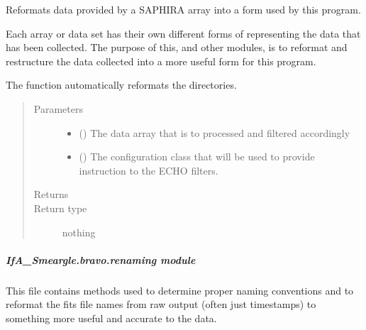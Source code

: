 \documentclass[letterpaper,10pt,english]{sphinxmanual}
\begin{document}
\begin{fulllineitems}
\label{\detokenize{python_docstrings/IfA_Smeargle.bravo.bravo_main:IfA_Smeargle.bravo.bravo_main.bravo_execution_saphira}}
Reformats data provided by a SAPHIRA array into a form used by this
program.

Each array or data set has their own different forms of representing the
data that has been collected. The purpose of this, and other modules, is
to reformat and restructure the data collected into a more useful form
for this program.

The function automatically reformats the directories.
\begin{quote}\begin{description}
\item[{Parameters}] \leavevmode\begin{itemize}
\item {} 
 () \textendash{} The data array that is to processed and filtered accordingly

\item {} 
 ({\hyperref[\detokenize{python_docstrings/IfA_Smeargle.yankee.yankee_main:IfA_Smeargle.yankee.yankee_main.SmeargleConfig}]{}}) \textendash{} The configuration class that will be used to provide instruction
to the ECHO filters.

\end{itemize}

\item[{Returns}] \leavevmode


\item[{Return type}] \leavevmode
nothing

\end{description}\end{quote}

\end{fulllineitems}



\subparagraph{IfA\_Smeargle.bravo.renaming module}
\label{\detokenize{python_docstrings/IfA_Smeargle.bravo.renaming:module-IfA_Smeargle.bravo.renaming}}\label{\detokenize{python_docstrings/IfA_Smeargle.bravo.renaming:ifa-smeargle-bravo-renaming-module}}\label{\detokenize{python_docstrings/IfA_Smeargle.bravo.renaming::doc}}
This file contains methods used to determine proper naming conventions and
to reformat the fits file names from raw output  (often just timestamps) to
something more useful and accurate to the data.
\end{document}
